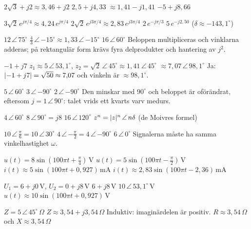 \begin{facit}
  $2\sqrt{3} + j2 \approx 3{,}46 + j2$  $2{,}5 + j4{,}33$  $\approx 1{,}41 - j1{,}41$
 $-5 + j8{,}66$

  $3\sqrt{2}\,e^{j\pi/4} \approx 4{,}24\,e^{j\pi/4}$
 $2\sqrt{2}\,e^{j3\pi/4} \approx 2{,}83\,e^{j3\pi/4}$
 $2\,e^{-j\pi/3}$  $5\,e^{-j2{,}50}$ ($\delta \approx -143{,}1^{\circ}$)

  $12\,\angle\,75^{\circ}$
 $\frac{4}{3}\,\angle\,{-15^{\circ}} \approx 1{,}33\,\angle\,{-15^{\circ}}$
 $16\,\angle\,60^{\circ}$
 Beloppen multipliceras och vinklarna adderas; på rektangulär form krävs fyra delprodukter
och hantering av $j^2$.

  $-1 + j7$
 $z_1 \approx 5\,\angle\,53{,}1^{\circ}$, $z_2 = \sqrt{2}\,\angle\,45^{\circ} \approx
1{,}41\,\angle\,45^{\circ}$
 $\approx 7{,}07\,\angle\,98{,}1^{\circ}$
 Ja: $\lvert-1 + j7\rvert = \sqrt{50} \approx 7{,}07$ och vinkeln är $\approx 98{,}1^{\circ}$.

  $5\,\angle\,60^{\circ}$  $3\,\angle\,{-90^{\circ}}$
 $2\,\angle\,{-90^{\circ}}$
 Den minskar med $90^{\circ}$ och beloppet är oförändrat, eftersom
$j = 1\,\angle\,90^{\circ}$: talet vrids ett kvarts varv medurs.

  $4\,\angle\,60^{\circ}$  $8\,\angle\,90^{\circ} = j8$
 $16\,\angle\,120^{\circ}$  $z^n = \lvert z\rvert^n\,\angle\,n\delta$ (de Moivres formel)

  $10\,\angle\,\frac{\pi}{6} = 10\,\angle\,30^{\circ}$
 $4\,\angle\,{-\frac{\pi}{2}} = 4\,\angle\,{-90^{\circ}}$
 $6\,\angle\,0^{\circ}$
 Signalerna måste ha samma vinkelhastighet $\omega$.

  $u(t) = 8\sin\left(100\pi t + \frac{\pi}{4}\right)\,\text{V}$
 $u(t) = 5\sin\left(100\pi t - \frac{\pi}{2}\right)\,\text{V}$
 $i(t) \approx 5\sin(100\pi t + 0{,}927)\,\text{mA}$
 $i(t) \approx 2{,}83\sin(100\pi t - 2{,}36)\,\text{mA}$

  $U_1 = 6 + j0\,\text{V}$, $U_2 = 0 + j8\,\text{V}$  $6 + j8\,\text{V}$
 $10\,\angle\,53{,}1^{\circ}\,\text{V}$
 $u(t) \approx 10\sin(100\pi t + 0{,}927)\,\text{V}$

  $Z = 5\,\angle\,45^{\circ}\,\Omega$  $Z \approx 3{,}54 + j3{,}54\,\Omega$
 Induktiv: imaginärdelen är positiv.
 $R \approx 3{,}54\,\Omega$ och $X \approx 3{,}54\,\Omega$


\end{facit}
